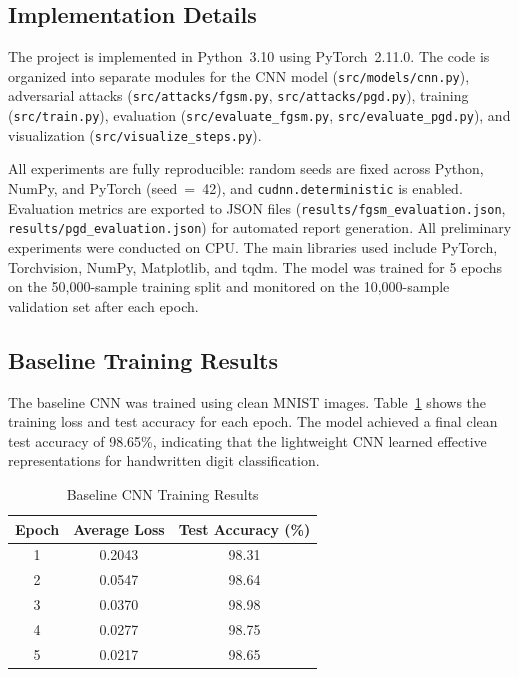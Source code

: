 \documentclass[conference]{IEEEtran}
\begin{document}
\subsection{Implementation Details}

The project is implemented in Python~3.10 using PyTorch~2.11.0. The code is organized into separate modules for the CNN model (\texttt{src/models/cnn.py}), adversarial attacks (\texttt{src/attacks/fgsm.py}, \texttt{src/attacks/pgd.py}), training (\texttt{src/train.py}), evaluation (\texttt{src/evaluate\_fgsm.py}, \texttt{src/evaluate\_pgd.py}), and visualization (\texttt{src/visualize\_steps.py}).

All experiments are fully reproducible: random seeds are fixed across Python, NumPy, and PyTorch (seed~=~42), and \texttt{cudnn.deterministic} is enabled. Evaluation metrics are exported to JSON files (\texttt{results/fgsm\_evaluation.json}, \texttt{results/pgd\_evaluation.json}) for automated report generation. All preliminary experiments were conducted on CPU. The main libraries used include PyTorch, Torchvision, NumPy, Matplotlib, and tqdm. The model was trained for 5 epochs on the 50,000-sample training split and monitored on the 10,000-sample validation set after each epoch.

\subsection{Baseline Training Results}

The baseline CNN was trained using clean MNIST images. Table~\ref{tab:training_results} shows the training loss and test accuracy for each epoch. The model achieved a final clean test accuracy of 98.65\%, indicating that the lightweight CNN learned effective representations for handwritten digit classification.

\begin{table}[htbp]
\caption{Baseline CNN Training Results}
\begin{center}
\begin{tabular}{|c|c|c|}
\hline
\textbf{Epoch} & \textbf{Average Loss} & \textbf{Test Accuracy (\%)} \\
\hline
1 & 0.2043 & 98.31 \\
\hline
2 & 0.0547 & 98.64 \\
\hline
3 & 0.0370 & 98.98 \\
\hline
4 & 0.0277 & 98.75 \\
\hline
5 & 0.0217 & 98.65 \\
\hline
\end{tabular}
\label{tab:training_results}
\end{center}
\end{table}
\end{document}
